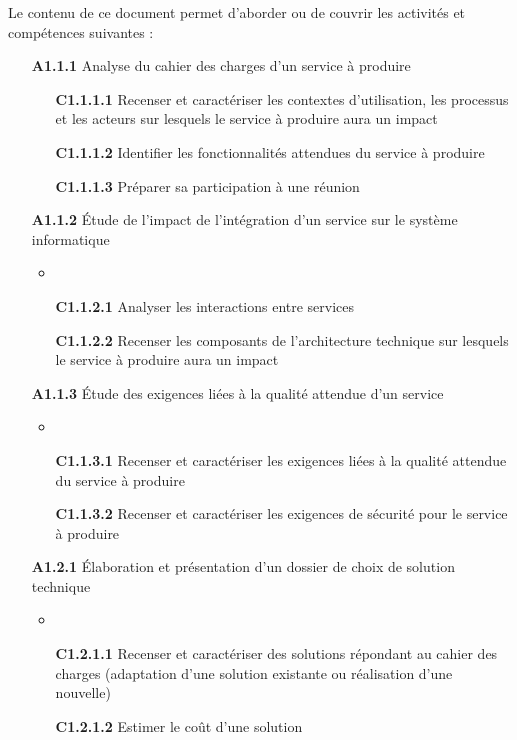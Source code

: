 \documentclass[12pt,a4paper,oneside,titlepage,final]{article}
\begin{document}
Le contenu de ce document permet d'aborder ou de couvrir les activités
et compétences suivantes :
\begin{enumerate}
  \item [\textbf{A1.1.1}] Analyse du cahier des charges d'un service à
  produire
  \begin{itemize}
    \item [\textbf{C1.1.1.1}] Recenser et caractériser les contextes
    d'utilisation, les processus et les acteurs sur lesquels le
    service à produire aura un impact
    \item [\textbf{C1.1.1.2}] Identifier les fonctionnalités attendues
    du service à produire
    \item [\textbf{C1.1.1.3}] Préparer sa participation à une réunion
  \end{itemize}
  \item [\textbf{A1.1.2}] Étude de l'impact de l'intégration d'un
  service sur le système informatique
  \begin{itemize}
    \item \item [\textbf{C1.1.2.1}] Analyser les interactions entre
    services
    \item [\textbf{C1.1.2.2}] Recenser les composants de
    l'architecture technique sur lesquels le service à produire aura
    un impact
  \end{itemize}
  \item [\textbf{A1.1.3}] Étude des exigences liées à la qualité
  attendue d'un service
  \begin{itemize}
    \item \item [\textbf{C1.1.3.1}] Recenser et caractériser les
    exigences liées à la qualité attendue du service à produire
    \item [\textbf{C1.1.3.2}] Recenser et caractériser les exigences
    de sécurité pour le service à produire
  \end{itemize}
  \item [\textbf{A1.2.1}] Élaboration et présentation d'un dossier de
  choix de solution technique
  \begin{itemize}
    \item \item [\textbf{C1.2.1.1}] Recenser et caractériser des
    solutions répondant au cahier des charges (adaptation d'une
    solution existante ou réalisation d'une nouvelle)
    \item [\textbf{C1.2.1.2}] Estimer le coût d'une solution

\end{itemize}
\end{enumerate}
\end{document}
